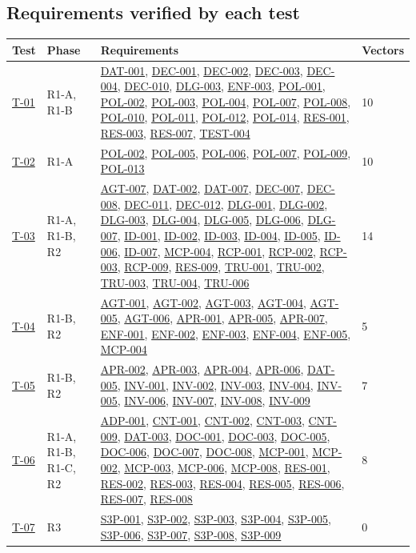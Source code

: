 \documentclass[11pt,a4paper]{article}
\newcommand{\rr}[1]{\hyperlink{req:#1}{#1}}
\begin{document}
\subsection*{Requirements verified by each test}
\begin{longtable}{@{}P{0.07\textwidth}P{0.10\textwidth}P{0.64\textwidth}P{0.08\textwidth}@{}}
\toprule Test & Phase & Requirements & Vectors\\\midrule\endhead
\hyperlink{test:T-01}{T-01} & R1-A, R1-B & \rr{DAT-001}, \rr{DEC-001}, \rr{DEC-002}, \rr{DEC-003}, \rr{DEC-004}, \rr{DEC-010}, \rr{DLG-003}, \rr{ENF-003}, \rr{POL-001}, \rr{POL-002}, \rr{POL-003}, \rr{POL-004}, \rr{POL-007}, \rr{POL-008}, \rr{POL-010}, \rr{POL-011}, \rr{POL-012}, \rr{POL-014}, \rr{RES-001}, \rr{RES-003}, \rr{RES-007}, \rr{TEST-004} & 10\\
\hyperlink{test:T-02}{T-02} & R1-A & \rr{POL-002}, \rr{POL-005}, \rr{POL-006}, \rr{POL-007}, \rr{POL-009}, \rr{POL-013} & 10\\
\hyperlink{test:T-03}{T-03} & R1-A, R1-B, R2 & \rr{AGT-007}, \rr{DAT-002}, \rr{DAT-007}, \rr{DEC-007}, \rr{DEC-008}, \rr{DEC-011}, \rr{DEC-012}, \rr{DLG-001}, \rr{DLG-002}, \rr{DLG-003}, \rr{DLG-004}, \rr{DLG-005}, \rr{DLG-006}, \rr{DLG-007}, \rr{ID-001}, \rr{ID-002}, \rr{ID-003}, \rr{ID-004}, \rr{ID-005}, \rr{ID-006}, \rr{ID-007}, \rr{MCP-004}, \rr{RCP-001}, \rr{RCP-002}, \rr{RCP-003}, \rr{RCP-009}, \rr{RES-009}, \rr{TRU-001}, \rr{TRU-002}, \rr{TRU-003}, \rr{TRU-004}, \rr{TRU-006} & 14\\
\hyperlink{test:T-04}{T-04} & R1-B, R2 & \rr{AGT-001}, \rr{AGT-002}, \rr{AGT-003}, \rr{AGT-004}, \rr{AGT-005}, \rr{AGT-006}, \rr{APR-001}, \rr{APR-005}, \rr{APR-007}, \rr{ENF-001}, \rr{ENF-002}, \rr{ENF-003}, \rr{ENF-004}, \rr{ENF-005}, \rr{MCP-004} & 5\\
\hyperlink{test:T-05}{T-05} & R1-B, R2 & \rr{APR-002}, \rr{APR-003}, \rr{APR-004}, \rr{APR-006}, \rr{DAT-005}, \rr{INV-001}, \rr{INV-002}, \rr{INV-003}, \rr{INV-004}, \rr{INV-005}, \rr{INV-006}, \rr{INV-007}, \rr{INV-008}, \rr{INV-009} & 7\\
\hyperlink{test:T-06}{T-06} & R1-A, R1-B, R1-C, R2 & \rr{ADP-001}, \rr{CNT-001}, \rr{CNT-002}, \rr{CNT-003}, \rr{CNT-009}, \rr{DAT-003}, \rr{DOC-001}, \rr{DOC-003}, \rr{DOC-005}, \rr{DOC-006}, \rr{DOC-007}, \rr{DOC-008}, \rr{MCP-001}, \rr{MCP-002}, \rr{MCP-003}, \rr{MCP-006}, \rr{MCP-008}, \rr{RES-001}, \rr{RES-002}, \rr{RES-003}, \rr{RES-004}, \rr{RES-005}, \rr{RES-006}, \rr{RES-007}, \rr{RES-008} & 8\\
\hyperlink{test:T-07}{T-07} & R3 & \rr{S3P-001}, \rr{S3P-002}, \rr{S3P-003}, \rr{S3P-004}, \rr{S3P-005}, \rr{S3P-006}, \rr{S3P-007}, \rr{S3P-008}, \rr{S3P-009} & 0\\

\end{longtable}
\end{document}
